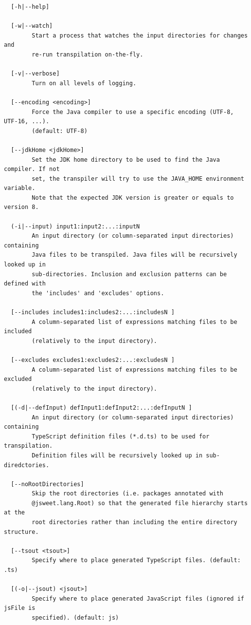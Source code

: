 \documentclass[a4paper]{report}
\begin{document}
\begin{small}
\begin{verbatim}
  [-h|--help]

  [-w|--watch]
        Start a process that watches the input directories for changes and
        re-run transpilation on-the-fly.

  [-v|--verbose]
        Turn on all levels of logging.

  [--encoding <encoding>]
        Force the Java compiler to use a specific encoding (UTF-8, UTF-16, ...).
        (default: UTF-8)

  [--jdkHome <jdkHome>]
        Set the JDK home directory to be used to find the Java compiler. If not
        set, the transpiler will try to use the JAVA_HOME environment variable.
        Note that the expected JDK version is greater or equals to version 8.

  (-i|--input) input1:input2:...:inputN 
        An input directory (or column-separated input directories) containing
        Java files to be transpiled. Java files will be recursively looked up in
        sub-directories. Inclusion and exclusion patterns can be defined with
        the 'includes' and 'excludes' options.

  [--includes includes1:includes2:...:includesN ]
        A column-separated list of expressions matching files to be included
        (relatively to the input directory).

  [--excludes excludes1:excludes2:...:excludesN ]
        A column-separated list of expressions matching files to be excluded
        (relatively to the input directory).

  [(-d|--defInput) defInput1:defInput2:...:defInputN ]
        An input directory (or column-separated input directories) containing
        TypeScript definition files (*.d.ts) to be used for transpilation.
        Definition files will be recursively looked up in sub-diredctories.

  [--noRootDirectories]
        Skip the root directories (i.e. packages annotated with
        @jsweet.lang.Root) so that the generated file hierarchy starts at the
        root directories rather than including the entire directory structure.

  [--tsout <tsout>]
        Specify where to place generated TypeScript files. (default: .ts)

  [(-o|--jsout) <jsout>]
        Specify where to place generated JavaScript files (ignored if jsFile is
        specified). (default: js)


\end{verbatim}
\end{small}
\end{document}
